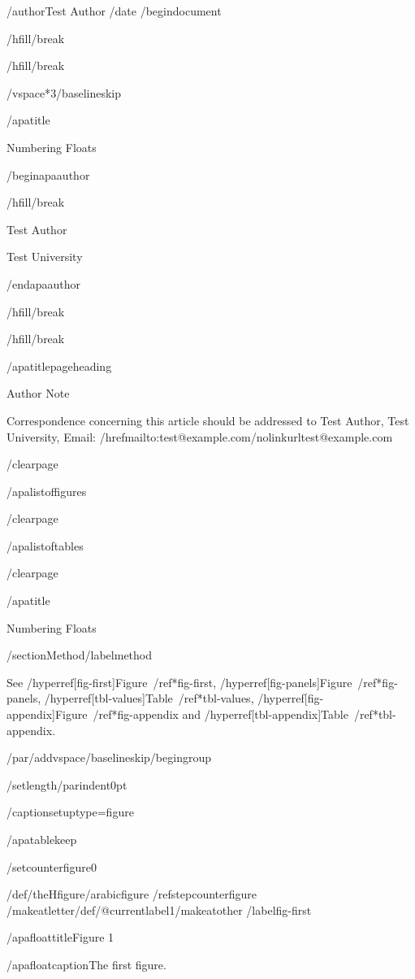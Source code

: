 /author{Test Author}
/date{}
/begin{document}


/hfill/break

/hfill/break

/vspace*{3/baselineskip}

/apatitle{

Numbering Floats

}

/begin{apaauthor}

/hfill/break

Test Author

Test University

/end{apaauthor}

/hfill/break

/hfill/break

/apatitlepageheading{

Author Note

}

Correspondence concerning this article should be addressed to Test
Author, Test University, Email:
/href{mailto:test@example.com}{/nolinkurl{test@example.com}}

/clearpage

/apalistoffigures

/clearpage

/apalistoftables

/clearpage

/apatitle{

Numbering Floats

}

/section{Method}/label{method}

See /hyperref[fig-first]{Figure~/ref*{fig-first}},
/hyperref[fig-panels]{Figure~/ref*{fig-panels}},
/hyperref[tbl-values]{Table~/ref*{tbl-values}},
/hyperref[fig-appendix]{Figure~/ref*{fig-appendix}} and
/hyperref[tbl-appendix]{Table~/ref*{tbl-appendix}}.

/par/addvspace{/baselineskip}/begingroup

/setlength{/parindent}{0pt}

/captionsetup{type=figure}

/apatablekeep

/setcounter{figure}{0}

/def/theHfigure{/arabic{figure}}%
/refstepcounter{figure}%
/makeatletter/def/@currentlabel{1}/makeatother%
/label{fig-first}

/apafloattitle{Figure 1}

/apafloatcaption{The first figure.}

